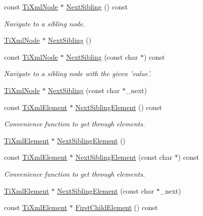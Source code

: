 \begin{DoxyCompactItemize}
const \hyperlink{class_ti_xml_node}{TiXmlNode} $\ast$ \hyperlink{class_ti_xml_node_af854baeba384f5fe9859f5aee03b548e}{NextSibling} () const 
\begin{DoxyCompactList}\small\item\em Navigate to a sibling node. \end{DoxyCompactList}\item 
\hyperlink{class_ti_xml_node}{TiXmlNode} $\ast$ \hyperlink{class_ti_xml_node_a4d05f7b1d7b470ac6887edd072d4892a}{NextSibling} ()
\item 
const \hyperlink{class_ti_xml_node}{TiXmlNode} $\ast$ \hyperlink{class_ti_xml_node_acaf9dc17531ac041f602f9ad579573ea}{NextSibling} (const char $\ast$) const 
\begin{DoxyCompactList}\small\item\em Navigate to a sibling node with the given 'value'. \end{DoxyCompactList}\item 
\hyperlink{class_ti_xml_node}{TiXmlNode} $\ast$ \hyperlink{class_ti_xml_node_a7529ac9b0a3b04c20973acf8d177cdd7}{NextSibling} (const char $\ast$\_\-next)
\item 
const \hyperlink{class_ti_xml_element}{TiXmlElement} $\ast$ \hyperlink{class_ti_xml_node_a7667217e269e0da01d1f82aee94d1a3d}{NextSiblingElement} () const 
\begin{DoxyCompactList}\small\item\em Convenience function to get through elements. \end{DoxyCompactList}\item 
\hyperlink{class_ti_xml_element}{TiXmlElement} $\ast$ \hyperlink{class_ti_xml_node_a1b211cb5034655a04358e0e2f6fc5010}{NextSiblingElement} ()
\item 
const \hyperlink{class_ti_xml_element}{TiXmlElement} $\ast$ \hyperlink{class_ti_xml_node_a3d7897999f99cf4870dd59df6331d7ff}{NextSiblingElement} (const char $\ast$) const 
\begin{DoxyCompactList}\small\item\em Convenience function to get through elements. \end{DoxyCompactList}\item 
\hyperlink{class_ti_xml_element}{TiXmlElement} $\ast$ \hyperlink{class_ti_xml_node_a6e1ac6b800e18049bc75e9f8e63a8e5f}{NextSiblingElement} (const char $\ast$\_\-next)
\item 
const \hyperlink{class_ti_xml_element}{TiXmlElement} $\ast$ \hyperlink{class_ti_xml_node_ab1f8d8e70d88aea4c5efedfe00862d55}{FirstChildElement} () const 

\end{DoxyCompactItemize}

